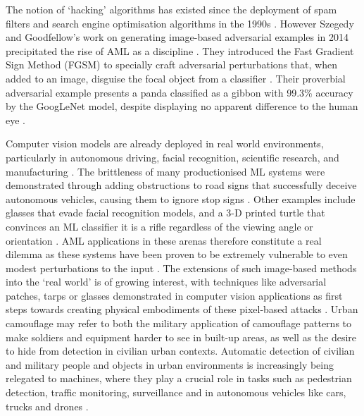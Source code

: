 \documentclass{article}
\begin{document}
The notion of `hacking' algorithms has existed since the deployment of spam filters and search engine optimisation algorithms in the 1990s \cite{papernot_marauders_2018}. However Szegedy and Goodfellow's work on generating image-based adversarial examples in 2014 precipitated the rise of AML as a discipline \cite{szegedy_intriguing_2014, goodfellow_explaining_2015}. They introduced the Fast Gradient Sign Method (FGSM) to specially craft adversarial perturbations that, when added to an image, disguise the focal object from a classifier \cite{szegedy_intriguing_2014, goodfellow_explaining_2015}. Their proverbial adversarial example presents a panda classified as a gibbon with 99.3\% accuracy by the GoogLeNet model, despite displaying no apparent difference to the human eye \cite{goodfellow_explaining_2015}.  

Computer vision models are already deployed in real world environments, particularly in autonomous driving, facial recognition, scientific research, and manufacturing \cite{khan_machine_2021}. The brittleness of many productionised ML systems were demonstrated through adding obstructions to road signs that successfully deceive autonomous vehicles, causing them to ignore stop signs \cite{eykholt_robust_2018}. Other examples include glasses that evade facial recognition models, and a 3-D printed turtle that convinces an ML classifier it is a rifle regardless of the viewing angle or orientation \cite{athalye_obfuscated_2018, sharif_accessorize_2016}.  AML applications in these arenas therefore constitute a real dilemma as these systems have been proven to be extremely vulnerable to even modest perturbations to the input \cite{li_review_2022}. The extensions of such image-based methods into the `real world' is of growing interest, with techniques like adversarial patches, tarps or glasses demonstrated in computer vision applications as first steps towards creating physical embodiments of these pixel-based attacks \cite{sharif_accessorize_2016, biggio_wild_2018,brown_adversarial_2018, wise_developing_2022}. Urban camouflage may refer to both the military application of camouflage patterns to make soldiers and equipment harder to see in built-up areas, as well as the desire to hide from detection in civilian urban contexts. Automatic detection of civilian and military people and objects in urban environments is increasingly being relegated to machines, where they play a crucial role in tasks such as pedestrian detection, traffic monitoring, surveillance and in autonomous vehicles like cars, trucks and drones \cite{pintor_imagenet-patch_2022}.     
\end{document}
